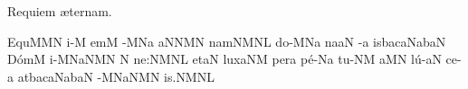 
\beginhymn Requiem \ae ternam.

\nosolesmescustos
{}\Internote
{}
\initiumgregorianum
{}%
\sgn {}E{qu}\punctum M\spatiumparvum\pes MN\egn
\sgn {}i-\punctum M\egn
\sgn {}em\punctum M\egn
\spatium
\asteriscus
\spatium
\sgn {}{\ae}-\punctum M\nonspatium\pes Na\egn
{}\clivis aN\spatiumparvum\porrectus NMN\egn
\sgn nam\clivis NM\augmentumduplex NL\egn
\spatium
\divisiominor
\spatium
\sgn d{o}-\punctum M\nonspatium\pes Na\egn
\sgn na{}\clivis aN\egn
\spatium
{}-\punctum a\egn
\spatium
\sgn {}is\bmolle b\pessubbipunctis acaN\quilisma a\nonspatium\climacus baN\egn
\spatium
\sgn D{\'o}m\punctum M\egn
\sgn {}i-\scandicussubbipunctis MNaNM\punctum N\egn
\custos N
\lineaproxima
\sgn ne:\clivis NM\augmentumduplex NL\egn
\spatium
\divisiomaior
\spatium
\sgn {}et\cephalicus aN\egn
\spatium
\sgn lux\climacus aNM\egn
\spatium
\sgn per\punctum a\egn
\sgn p{\'e}-\pes Na\egn
\sgn tu-\clivis NM\egn
\sgn {}a{}\punctum M\augmentum N\egn
\spatium
\divisiominor
\spatium
\sgn l{\'u}-\clivis aN\egn
\sgn ce-\punctum a\egn
\spatium
\sgn {}at\bmolle b\pessubbipunctis acaN\quilisma a\nonspatium\climacus baN\egn
\spatium
{}-\scandicussubbipunctis MNaNM\nonspatium\punctum N\egn
\spatium
\sgn {}i{s.}\clivis NM\augmentumduplex NL\egn
\spatium
\Finisgregoriana

\bigskip




